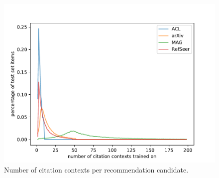 \begin{figure}[tb]
  \centering
    \includegraphics[width=.8\textwidth]{figures/evaluation/comparison_contexts_per_cited_doc.pdf}
  \caption{Number of citation contexts per recommendation candidate.}
  \label{fig:evalcomp}
\end{figure}


